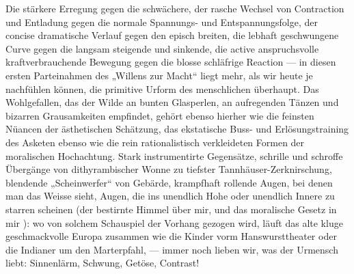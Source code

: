 Die stärkere Erregung gegen die schwächere, der rasche Wechsel von Contraction und Entladung gegen die normale Spannungs- und Entspannungsfolge, der concise dramatische Verlauf gegen den episch breiten, die lebhaft geschwungene Curve gegen die langsam steigende und sinkende, die active anspruchsvolle kraftverbrauchende Bewegung gegen die blosse schläfrige Reaction — in diesen ersten Parteinahmen des „Willens zur Macht“ liegt mehr, als wir heute je nachfühlen können, die primitive Urform des menschlichen  überhaupt. Das Wohlgefallen, das der Wilde an bunten Glasperlen, an aufregenden Tänzen und bizarren Grausamkeiten empfindet, gehört ebenso hierher wie die feinsten Nüancen der ästhetischen Schätzung, das ekstatische Buss- und Erlösungstraining des Asketen ebenso wie die rein rationalistisch verkleideten Formen der moralischen Hochachtung. Stark instrumentirte Gegensätze, schrille und schroffe Übergänge von dithyrambischer Wonne zu tiefster Tannhäuser-Zerknirschung, blendende „Scheinwerfer“ von Gebärde, krampfhaft rollende Augen, bei denen man das Weisse sieht, Augen, die ins unendlich Hohe oder unendlich Innere zu starren scheinen (der bestirnte Himmel über mir, und das moralische Gesetz in mir ): wo von solchem Schauspiel der Vorhang gezogen wird, läuft das alte kluge geschmackvolle Europa zusammen wie die Kinder vorm Hanswursttheater oder die Indianer um den Marterpfahl, — immer noch lieben wir, was der Urmensch liebt: Sinnenlärm, Schwung, Getöse, Contrast!
\par

